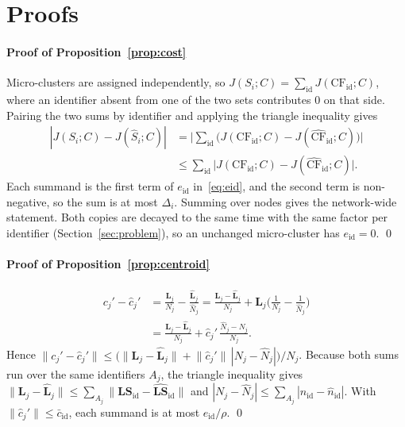 \appendix
\section{Proofs}\label{app:proofs}

\paragraph{Proof of Proposition~\ref{prop:cost}} Micro-clusters are assigned independently, so $J(S_i;C)=\sum_{\mathrm{id}}J(\mathrm{CF}_{\mathrm{id}};C)$, where an identifier absent from one of the two sets contributes $0$ on that side. Pairing the two sums by identifier and applying the triangle inequality gives
\begin{align*}
|J(S_i;C)-J(\hat S_i;C)|&=\Big|\sum_{\mathrm{id}}\big(J(\mathrm{CF}_{\mathrm{id}};C)-J(\widehat{\mathrm{CF}}_{\mathrm{id}};C)\big)\Big|\\
&\le\sum_{\mathrm{id}}\big|J(\mathrm{CF}_{\mathrm{id}};C)-J(\widehat{\mathrm{CF}}_{\mathrm{id}};C)\big| .
\end{align*}
Each summand is the first term of $e_{\mathrm{id}}$ in~\eqref{eq:eid}, and the second term is non-negative, so the sum is at most $\Delta_i$. Summing over nodes gives the network-wide statement. Both copies are decayed to the same time with the same factor per identifier (Section~\ref{sec:problem}), so an unchanged micro-cluster has $e_{\mathrm{id}}=0$. \qed

\paragraph{Proof of Proposition~\ref{prop:centroid}}
\begin{align*}
c_j'-\hat c_j'&=\frac{\mathbf{L}_j}{N_j}-\frac{\hat{\mathbf{L}}_j}{\hat N_j}=\frac{\mathbf{L}_j-\hat{\mathbf{L}}_j}{N_j}+\hat{\mathbf{L}}_j\Big(\frac1{N_j}-\frac1{\hat N_j}\Big)\\
&=\frac{\mathbf{L}_j-\hat{\mathbf{L}}_j}{N_j}+\hat c_j'\,\frac{\hat N_j-N_j}{N_j}.
\end{align*}
Hence $\lVert c_j'-\hat c_j'\rVert\le\big(\lVert\mathbf{L}_j-\hat{\mathbf{L}}_j\rVert+\lVert\hat c_j'\rVert\,|N_j-\hat N_j|\big)/N_j$. Because both sums run over the same identifiers $A_j$, the triangle inequality gives $\lVert\mathbf{L}_j-\hat{\mathbf{L}}_j\rVert\le\sum_{A_j}\lVert\mathbf{LS}_{\mathrm{id}}-\widehat{\mathbf{LS}}_{\mathrm{id}}\rVert$ and $|N_j-\hat N_j|\le\sum_{A_j}|n_{\mathrm{id}}-\hat n_{\mathrm{id}}|$. With $\lVert\hat c_j'\rVert\le\bar c_{\mathrm{id}}$, each summand is at most $e_{\mathrm{id}}/\rho$. \qed

